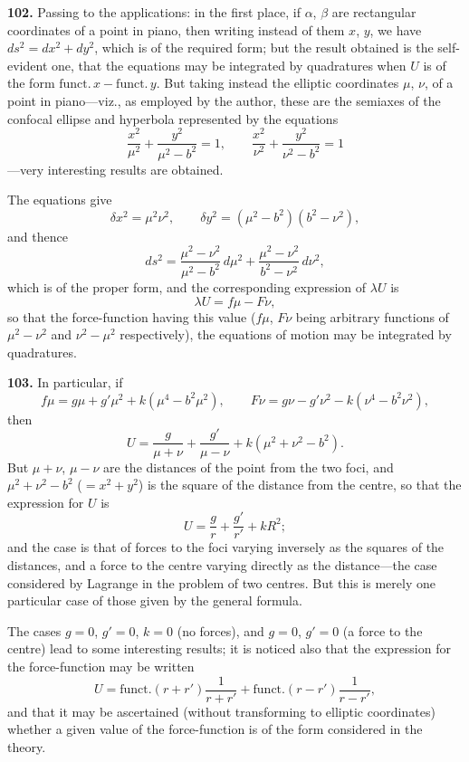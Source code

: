 \documentclass[11pt,a4paper]{book}
\begin{document}
\textbf{102.} Passing to the applications: in the first place, if $\alpha$, $\beta$ are rectangular coordinates of a point in piano, then writing instead of them $x$, $y$, we have $ds^2 = dx^2 + dy^2$, which is of the required form; but the result obtained is the self-evident one, that the equations may be integrated by quadratures when $U$ is of the form $\text{funct.}\,x - \text{funct.}\,y$. But taking instead the elliptic coordinates $\mu$, $\nu$, of a point in piano---viz., as employed by the author, these are the semiaxes of the confocal ellipse and hyperbola represented by the equations
\[
\frac{x^2}{\mu^2} + \frac{y^2}{\mu^2 - b^2} = 1, \qquad \frac{x^2}{\nu^2} + \frac{y^2}{\nu^2 - b^2} = 1
\]
---very interesting results are obtained.

The equations give
\[
\delta x^2 = \mu^2\nu^2, \qquad \delta y^2 = (\mu^2 - b^2)(b^2 - \nu^2),
\]
and thence
\[
ds^2 = \frac{\mu^2 - \nu^2}{\mu^2 - b^2}\,d\mu^2 + \frac{\mu^2 - \nu^2}{b^2 - \nu^2}\,d\nu^2,
\]
which is of the proper form, and the corresponding expression of $\lambda U$ is
\[
\lambda U = f\mu - F\nu,
\]
so that the force-function having this value ($f\mu$, $F\nu$ being arbitrary functions of $\mu^2 - \nu^2$ and $\nu^2 - \mu^2$ respectively), the equations of motion may be integrated by quadratures.

\textbf{103.} In particular, if
\[
f\mu = g\mu + g'\mu^2 + k(\mu^4 - b^2\mu^2), \qquad F\nu = g\nu - g'\nu^2 - k(\nu^4 - b^2\nu^2),
\]
then
\[
U = \frac{g}{\mu + \nu} + \frac{g'}{\mu - \nu} + k(\mu^2 + \nu^2 - b^2).
\]
But $\mu + \nu$, $\mu - \nu$ are the distances of the point from the two foci, and $\mu^2 + \nu^2 - b^2$ ($= x^2 + y^2$) is the square of the distance from the centre, so that the expression for $U$ is
\[
U = \frac{g}{r} + \frac{g'}{r'} + kR^2;
\]
and the case is that of forces to the foci varying inversely as the squares of the distances, and a force to the centre varying directly as the distance---the case considered by Lagrange in the problem of two centres. But this is merely one particular case of those given by the general formula.

The cases $g = 0$, $g' = 0$, $k = 0$ (no forces), and $g = 0$, $g' = 0$ (a force to the centre) lead to some interesting results; it is noticed also that the expression for the force-function may be written
\[
U = \text{funct.}(r + r') \frac{1}{r + r'} + \text{funct.}(r - r') \frac{1}{r - r'},
\]
and that it may be ascertained (without transforming to elliptic coordinates) whether a given value of the force-function is of the form considered in the theory.
\end{document}
